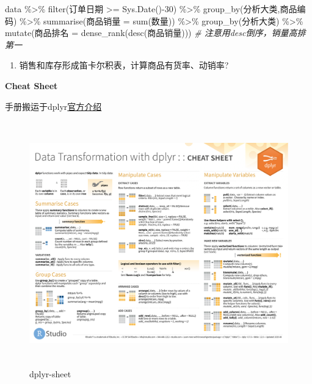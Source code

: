 \documentclass[
]{book}
\newenvironment{Shaded}{\begin{snugshade}}{\end{snugshade}}
\newcommand{\CommentTok}[1]{\textcolor[rgb]{0.56,0.35,0.01}{\textit{#1}}}
\newcommand{\DecValTok}[1]{\textcolor[rgb]{0.00,0.00,0.81}{#1}}
\newcommand{\FunctionTok}[1]{\textcolor[rgb]{0.00,0.00,0.00}{#1}}
\newcommand{\NormalTok}[1]{#1}
\newcommand{\OtherTok}[1]{\textcolor[rgb]{0.56,0.35,0.01}{#1}}
\newcommand{\SpecialCharTok}[1]{\textcolor[rgb]{0.00,0.00,0.00}{#1}}
\providecommand{\tightlist}{%
  \setlength{\itemsep}{0pt}\setlength{\parskip}{0pt}}
\begin{document}
\begin{Shaded}
\begin{Highlighting}[]
\NormalTok{data }\SpecialCharTok{\%\textgreater{}\%} 
  \FunctionTok{filter}\NormalTok{(订单日期 }\SpecialCharTok{\textgreater{}=} \FunctionTok{Sys.Date}\NormalTok{()}\SpecialCharTok{{-}}\DecValTok{30}\NormalTok{) }\SpecialCharTok{\%\textgreater{}\%} 
  \FunctionTok{group\_by}\NormalTok{(分析大类,商品编码) }\SpecialCharTok{\%\textgreater{}\%} 
  \FunctionTok{summarise}\NormalTok{(商品销量 }\OtherTok{=} \FunctionTok{sum}\NormalTok{(数量)) }\SpecialCharTok{\%\textgreater{}\%} 
  \FunctionTok{group\_by}\NormalTok{(分析大类) }\SpecialCharTok{\%\textgreater{}\%} 
  \FunctionTok{mutate}\NormalTok{(商品排名 }\OtherTok{=} \FunctionTok{dense\_rank}\NormalTok{(}\FunctionTok{desc}\NormalTok{(商品销量))) }
\CommentTok{\# 注意用desc倒序，销量高排第一}
\end{Highlighting}
\end{Shaded}

\begin{enumerate}
\def\labelenumi{\arabic{enumi}.}
\setcounter{enumi}{2}
\tightlist
\item
  销售和库存形成笛卡尔积表，计算商品有货率、动销率?
\end{enumerate}

\textbf{Cheat Sheet}

手册搬运于dplyr\href{https://dplyr.tidyverse.org/}{官方介绍}

\begin{figure}
\centering
\includegraphics[width=1\textwidth,height=4.16667in]{./picture/dplyr/data-transformation.pdf}
\caption{dplyr-sheet}
\end{figure}
\end{document}
